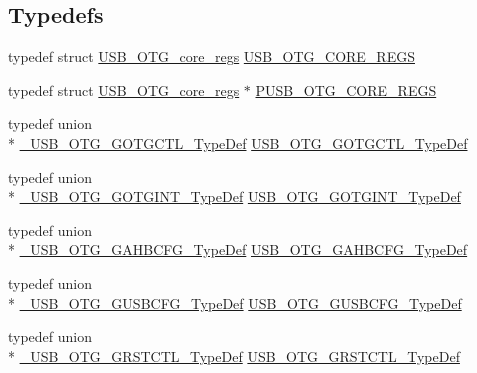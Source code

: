 \subsection*{Typedefs}
\begin{DoxyCompactItemize}
\item 
typedef struct \hyperlink{struct_u_s_b___o_t_g__core__regs}{U\-S\-B\-\_\-\-O\-T\-G\-\_\-core\-\_\-regs} \hyperlink{group______otg___core__registers_gaec970ace8b42f73987f30d48b013febf}{U\-S\-B\-\_\-\-O\-T\-G\-\_\-\-C\-O\-R\-E\-\_\-\-R\-E\-G\-S}
\item 
typedef struct \hyperlink{struct_u_s_b___o_t_g__core__regs}{U\-S\-B\-\_\-\-O\-T\-G\-\_\-core\-\_\-regs} $\ast$ \hyperlink{group______otg___core__registers_ga130f3a708d75c3533468af0b358bb0c9}{P\-U\-S\-B\-\_\-\-O\-T\-G\-\_\-\-C\-O\-R\-E\-\_\-\-R\-E\-G\-S}
\item 
typedef union \\*
\hyperlink{union___u_s_b___o_t_g___g_o_t_g_c_t_l___type_def}{\-\_\-\-U\-S\-B\-\_\-\-O\-T\-G\-\_\-\-G\-O\-T\-G\-C\-T\-L\-\_\-\-Type\-Def} \hyperlink{group______otg___core__registers_ga2eea565c0e6c7a6025cd751070fb1e4e}{U\-S\-B\-\_\-\-O\-T\-G\-\_\-\-G\-O\-T\-G\-C\-T\-L\-\_\-\-Type\-Def}
\item 
typedef union \\*
\hyperlink{union___u_s_b___o_t_g___g_o_t_g_i_n_t___type_def}{\-\_\-\-U\-S\-B\-\_\-\-O\-T\-G\-\_\-\-G\-O\-T\-G\-I\-N\-T\-\_\-\-Type\-Def} \hyperlink{group______otg___core__registers_ga91eefcb2f321d010c1edc17ca04bcd13}{U\-S\-B\-\_\-\-O\-T\-G\-\_\-\-G\-O\-T\-G\-I\-N\-T\-\_\-\-Type\-Def}
\item 
typedef union \\*
\hyperlink{union___u_s_b___o_t_g___g_a_h_b_c_f_g___type_def}{\-\_\-\-U\-S\-B\-\_\-\-O\-T\-G\-\_\-\-G\-A\-H\-B\-C\-F\-G\-\_\-\-Type\-Def} \hyperlink{group______otg___core__registers_gad6422635bd25a836aa6606fa909f74fe}{U\-S\-B\-\_\-\-O\-T\-G\-\_\-\-G\-A\-H\-B\-C\-F\-G\-\_\-\-Type\-Def}
\item 
typedef union \\*
\hyperlink{union___u_s_b___o_t_g___g_u_s_b_c_f_g___type_def}{\-\_\-\-U\-S\-B\-\_\-\-O\-T\-G\-\_\-\-G\-U\-S\-B\-C\-F\-G\-\_\-\-Type\-Def} \hyperlink{group______otg___core__registers_ga280a43f95dd0526ca17294b16f9833ea}{U\-S\-B\-\_\-\-O\-T\-G\-\_\-\-G\-U\-S\-B\-C\-F\-G\-\_\-\-Type\-Def}
\item 
typedef union \\*
\hyperlink{union___u_s_b___o_t_g___g_r_s_t_c_t_l___type_def}{\-\_\-\-U\-S\-B\-\_\-\-O\-T\-G\-\_\-\-G\-R\-S\-T\-C\-T\-L\-\_\-\-Type\-Def} \hyperlink{group______otg___core__registers_ga82ea2e541684f706d7d640bed24f8fcc}{U\-S\-B\-\_\-\-O\-T\-G\-\_\-\-G\-R\-S\-T\-C\-T\-L\-\_\-\-Type\-Def}

\end{DoxyCompactItemize}
